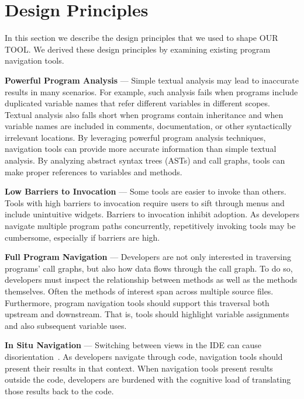 \documentclass[conference]{IEEEtran}
\newcommand{\toolName}{OUR TOOL}
\begin{document}
\section{Design Principles}
\label{DesignPrinciples}
In this section we describe the design principles that we used to shape \toolName. We derived these design principles by examining existing program navigation tools.
 
\vspace{1em} 
\noindent\textbf{Powerful Program Analysis} ---
Simple textual analysis may lead to inaccurate results in many scenarios. For example, such analysis fails when programs include duplicated variable names that refer different variables in different scopes. Textual analysis also falls short when programs contain inheritance and when variable names are included in comments, documentation, or other syntactically irrelevant locations.
By leveraging powerful program analysis techniques, navigation tools can provide more accurate information than simple textual analysis.
By analyzing abstract syntax trees (ASTs) and call graphs, tools can make proper references to variables and methods. 

\vspace{1em} 
\noindent\textbf{Low Barriers to Invocation} ---
Some tools are easier to invoke than others. 
Tools with high barriers to invocation require users to sift through menus and include unintuitive widgets. 
Barriers to invocation inhibit adoption. 
As developers navigate multiple program paths concurrently, repetitively invoking tools may be cumbersome, especially if barriers are high. 


\vspace{1em} 
\noindent\textbf{Full Program Navigation}  ---
Developers are not only interested in traversing programs' call graphs, but also how data flows through the call graph.
To do so, developers must inspect the relationship between methods as well as the methods themselves.
Often the methods of interest span across multiple source files.
Furthermore, program navigation tools should support this traversal both upstream and downstream. 
That is, tools should highlight variable assignments and also subsequent variable uses. 

\vspace{1em} 
\noindent\textbf{In Situ Navigation}  ---
Switching between views in the IDE can cause disorientation~\cite{deAlwis2006disorient}. As developers navigate through code, navigation tools should present their results in that context. 
When navigation tools present results outside the code, developers are burdened with the cognitive load of translating those results back to the code.
\end{document}
